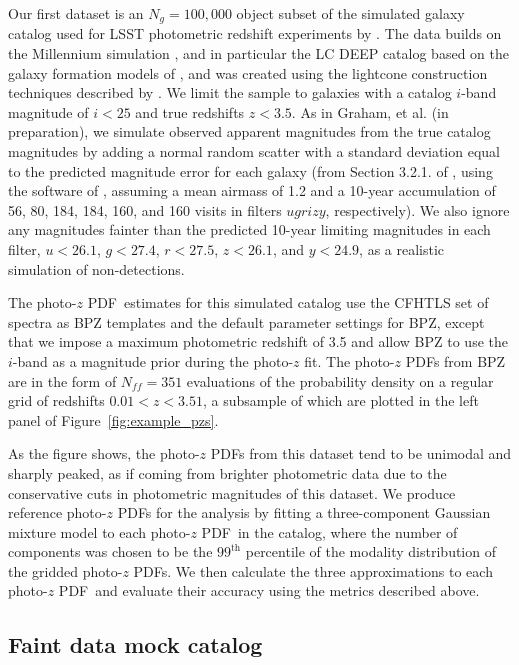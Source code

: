 \documentclass[\docopts]{\docclass}
\newcommand{\pz}{photo-$z$ PDF}
\newcommand{\Ssdata}{Faint\xspace}
\begin{document}
Our first dataset is an $N_{g}=100,000$ object subset of the simulated galaxy 
catalog used for LSST photometric redshift experiments by 
\citet{graham_photometric_2017}.
The data builds on the Millennium simulation \citep{springel_simulations_2005}, 
and in particular the LC DEEP catalog based on the galaxy formation models of 
\citet{gonzalez-perez_how_2014}, and was created using the lightcone 
construction techniques described by \citet{merson_lightcone_2013}.
We limit the sample to galaxies with a catalog $i$-band magnitude of $i<25$ and 
true redshifts $z<3.5$.
As in Graham, et al. (in preparation), we simulate observed apparent magnitudes 
from the true catalog magnitudes by adding a normal random scatter with a 
standard deviation equal to the predicted magnitude error for each galaxy (from 
Section 3.2.1. of \citet{ivezic_lsst:_2008}, using the software of 
\citet{connolly_end--end_2014}, assuming a mean airmass of 1.2 and a 10-year 
accumulation of 56, 80, 184, 184, 160, and 160 visits in filters $ugrizy$, 
respectively).
We also ignore any magnitudes fainter than the predicted 10-year limiting 
magnitudes in each filter, $u<26.1$, $g<27.4$, $r<27.5$, $z<26.1$, and 
$y<24.9$, as a realistic simulation of non-detections.

The \pz\ estimates for this simulated catalog use the CFHTLS set of spectra 
\citep{ilbert_accurate_2006} as BPZ templates and the default parameter 
settings for BPZ, except that we impose a maximum photometric redshift of 3.5 
and allow BPZ to use the $i$-band as a magnitude prior during the photo-$z$ fit.
The \pz s from BPZ are in the form of $N_{ff} = 351$ evaluations of the 
probability density on a regular grid of redshifts $0.01 < z < 3.51$, a 
subsample of which are plotted in the left panel of 
Figure~\ref{fig:example_pzs}.

As the figure shows, the \pz s from this dataset tend to be unimodal and 
sharply peaked, as if coming from brighter photometric data due to the 
conservative cuts in photometric magnitudes of this dataset.
We produce reference \pz s for the analysis by fitting a three-component 
Gaussian mixture model to each \pz\ in the catalog, where the number of 
components was chosen to be the $99^{\mathrm{th}}$ percentile of the modality 
distribution of the gridded \pz s.
We then calculate the three approximations to each \pz\ and evaluate their 
accuracy using the metrics described above.

\subsection{\Ssdata data mock catalog}
\label{sec:schmidt}
\end{document}
